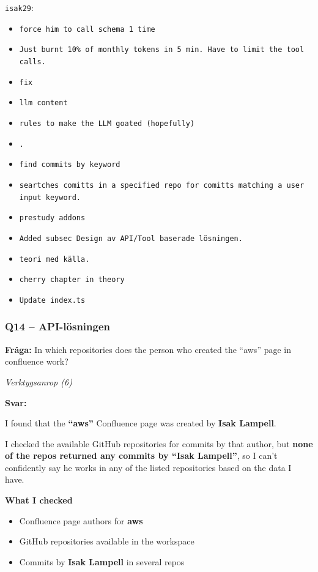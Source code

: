 \texttt{isak29}:
\begin{itemize}
    \item \texttt{force him to call schema 1 time}
    \item \texttt{Just burnt 10\% of monthly tokens in 5 min. Have to limit the tool calls.}
    \item \texttt{fix}
    \item \texttt{llm content}
    \item \texttt{rules to make the LLM goated (hopefully)}
    \item \texttt{.}
    \item \texttt{find commits by keyword}
    \item \texttt{seartches comitts in a specified repo for comitts matching a user input keyword.}
    \item \texttt{prestudy addons}
    \item \texttt{Added subsec Design av API/Tool baserade lösningen.}
    \item \texttt{teori med källa.}
    \item \texttt{cherry chapter in theory}
    \item \texttt{Update index.ts}
\end{itemize}

\clearpage
\subsubsection*{Q14 -- API-lösningen}\label{fig:api_q14}

\textbf{Fråga:} In which repositories does the person who created the ``aws'' page in confluence work?

\medskip
\textit{Verktygsanrop (6)}

\medskip
\textbf{Svar:}

I found that the \textbf{``aws''} Confluence page was created by \textbf{Isak Lampell}.

I checked the available GitHub repositories for commits by that author, but \textbf{none of the repos returned any commits by ``Isak Lampell''}, so I can't confidently say he works in any of the listed repositories based on the data I have.

\textbf{What I checked}
\begin{itemize}
    \item Confluence page authors for \textbf{aws}
    \item GitHub repositories available in the workspace
    \item Commits by \textbf{Isak Lampell} in several repos
\end{itemize}


